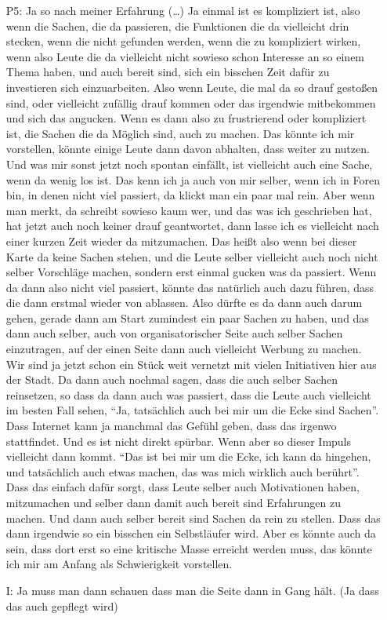 \begin{itemize}
    \item[P5:] Ja so nach meiner Erfahrung (\dots) Ja einmal ist es kompliziert ist, also wenn die Sachen, die da passieren, die Funktionen die da vielleicht drin stecken, wenn die nicht gefunden werden, wenn die zu kompliziert wirken, wenn also Leute die da vielleicht nicht sowieso schon Interesse an so einem Thema haben, und auch bereit sind, sich ein bisschen Zeit daf{\"u}r zu investieren sich einzuarbeiten. Also wenn Leute, die mal da so drauf gesto{\ss}en sind, oder vielleicht zuf{\"a}llig drauf kommen oder das irgendwie mitbekommen und sich das angucken. Wenn es dann also zu frustrierend oder kompliziert ist, die Sachen die da M{\"o}glich sind, auch zu machen. Das k{\"o}nnte ich mir vorstellen, k{\"o}nnte einige Leute dann davon abhalten, dass weiter zu nutzen. Und was mir sonst jetzt noch spontan einf{\"a}llt, ist vielleicht auch eine Sache, wenn da wenig los ist. Das kenn ich ja auch von mir selber, wenn ich in Foren bin, in denen nicht viel passiert, da klickt man ein paar mal rein. Aber wenn man merkt, da schreibt sowieso kaum wer, und das was ich geschrieben hat, hat jetzt auch noch keiner drauf geantwortet, dann lasse ich es vielleicht nach einer kurzen Zeit wieder da mitzumachen. Das hei{\ss}t also wenn bei dieser Karte da keine Sachen stehen, und die Leute selber vielleicht auch noch nicht selber Vorschl{\"a}ge machen, sondern erst einmal gucken was da passiert. Wenn da dann also nicht viel passiert, k{\"o}nnte das nat{\"u}rlich auch dazu f{\"u}hren, dass die dann erstmal wieder von ablassen. Also d{\"u}rfte es da dann auch darum gehen, gerade dann am Start zumindest ein paar Sachen zu haben, und das dann auch selber, auch von organisatorischer Seite auch selber Sachen einzutragen, auf der einen Seite dann auch vielleicht Werbung zu machen. Wir sind ja jetzt schon ein St{\"u}ck weit vernetzt mit vielen Initiativen hier aus der Stadt. Da dann auch nochmal sagen, dass die auch selber Sachen reinsetzen, so dass da dann auch was passiert, dass die Leute auch vielleicht im besten Fall sehen, "`Ja, tats{\"a}chlich auch bei mir um die Ecke sind Sachen"'. Dass Internet kann ja manchmal das Gef{\"u}hl geben, dass das irgenwo stattfindet. Und es ist nicht direkt sp{\"u}rbar. Wenn aber so dieser Impuls vielleicht dann kommt. "`Das ist bei mir um die Ecke, ich kann da hingehen, und tats{\"a}chlich auch etwas machen, das was mich wirklich auch ber{\"u}hrt"'. Dass das einfach daf{\"u}r sorgt, dass Leute selber auch Motivationen haben, mitzumachen und selber dann damit auch bereit sind Erfahrungen zu machen. Und dann auch selber bereit sind Sachen da rein zu stellen. Dass das dann irgendwie so ein bisschen ein Selbstl{\"a}ufer wird. Aber es k{\"o}nnte auch da sein, dass dort erst so eine kritische Masse erreicht werden muss, das k{\"o}nnte ich mir am Anfang als Schwierigkeit vorstellen.
    \item[I:] Ja muss man dann schauen dass man die Seite dann in Gang h{\"a}lt. (Ja dass das auch gepflegt wird)
\end{itemize}

